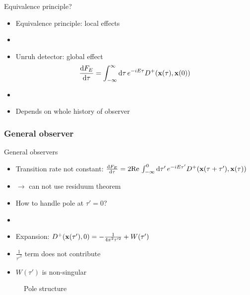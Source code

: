 \documentclass{beamer}
\begin{document}
\begin{frame}{Equivalence principle?}
\begin{itemize}
	\item Equivalence principle: local effects
	\item[]
	\item Unruh detector: global effect
		\[\dv{F_E}{\tau} = \int_{-\infty}^\infty \dd{\tau} e^{-i E \tau} D^+(\vb{x}(\tau), \vb{x}(0))\]
	\item[]
	\item Depends on whole history of observer 
\end{itemize}
\end{frame}


\subsubsection{General observer}
\begin{frame}{General observers}
\begin{itemize}
	\item Transition rate not constant: \(\dv{F_E}{\tau} = 2 \mathrm{Re}\,\int_{-\infty}^0 \dd{\tau'} e^{-i E \tau'} D^+(\vb{x}(\tau + \tau'), \vb{x}(\tau))\)
	\item[]\(\to\) can not use residuum theorem
	\item How to handle pole at \(\tau' = 0\)?
	\item[]
	\item Expansion: \(D^+(\vb{x}(\tau'), 0) = - \frac{1}{4\pi^2\tau'^2} + W(\tau')\)
	\item \(\frac{1}{\tau'^2}\) term does not contribute
	\item \(W(\tau')\) is non-singular
\end{itemize}
\begin{figure}
\centering
{}
\caption{Pole structure}
\end{figure}
\end{frame}

\frame{\setcounter{tocdepth}{1}\hspace{1cm}\tableofcontents}
\end{document}
